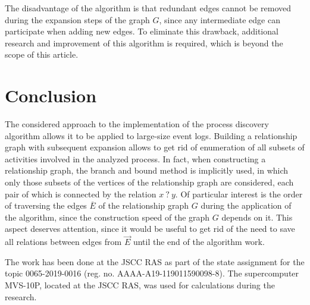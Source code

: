 \documentclass[
11pt,%
tightenlines,%
twoside,%
onecolumn,%
nofloats,%
nobibnotes,%
nofootinbib,%
superscriptaddress,%
noshowpacs,%
centertags]%
{revtex4}
\begin{document}
The disadvantage of the algorithm is that redundant edges cannot be removed during the expansion steps of the graph $G$, since any intermediate edge can participate when adding new edges.
To eliminate this drawback, additional research and improvement of this algorithm is required, which is beyond the scope of this article.

\section{Conclusion}

The considered approach to the implementation of the process discovery algorithm allows it to be applied to large-size event logs.
Building a relationship graph with subsequent expansion allows to get rid of enumeration of all subsets of activities involved in the analyzed process.
In fact, when constructing a relationship graph, the branch and bound method is implicitly used, in which only those subsets of the vertices of the relationship graph are considered, each pair of which is connected by the relation $x \ ? \ y$.
Of particular interest is the order of traversing the edges $\overline{E}$ of the relationship graph $G$ during the application of the algorithm, since the construction speed of the graph $G$ depends on it.
This aspect deserves attention, since it would be useful to get rid of the need to save all relations between edges from $\overrightarrow{E}$ until the end of the algorithm work.

\begin{acknowledgments}
The work has been done at the JSCC RAS as part of the state assignment for the topic 0065-2019-0016 (reg. no. AAAA-A19-119011590098-8). The supercomputer MVS-10P, located at the JSCC RAS, was used for calculations during the research.
\end{acknowledgments}
\end{document}

